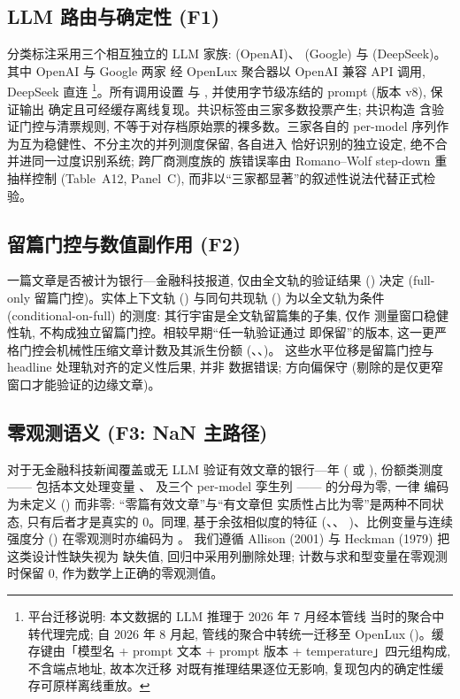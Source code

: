 \subsection{LLM 路由与确定性 (F1)}
分类标注采用三个相互独立的 LLM 家族: 
(OpenAI)、 (Google) 与
 (DeepSeek)。其中 OpenAI 与 Google 两家
经 OpenLux 聚合器以 OpenAI 兼容 API 调用, DeepSeek 直连
\footnote{平台迁移说明: 本文数据的 LLM 推理于 2026 年 7 月经本管线
当时的聚合中转代理完成; 自 2026 年 8 月起, 管线的聚合中转统一迁移至
OpenLux ()。缓存键由「模型名 + prompt
文本 + prompt 版本 + temperature」四元组构成, 不含端点地址, 故本次迁移
对既有推理结果逐位无影响, 复现包内的确定性缓存可原样离线重放。}。所有调用设置  与
, 并使用字节级冻结的 prompt (版本 v8), 保证输出
确定且可经缓存离线复现。共识标签由三家多数投票产生; 共识构造
含验证门控与清票规则, 不等于对存档原始票的裸多数。三家各自的
per-model 序列作为互为稳健性、不分主次的并列测度保留, 各自进入
恰好识别的独立设定, 绝不合并进同一过度识别系统; 跨厂商测度族的
族错误率由 Romano--Wolf step-down 重抽样控制 (Table~A12,
Panel~C), 而非以``三家都显著''的叙述性说法代替正式检验。

\subsection{留篇门控与数值副作用 (F2)}
一篇文章是否被计为银行—金融科技报道, 仅由全文轨的验证结果
() 决定 (full-only 留篇门控)。实体上下文轨
() 与同句共现轨 () 为以全文轨为条件
(conditional-on-full) 的测度: 其行宇宙是全文轨留篇集的子集, 仅作
测量窗口稳健性轨, 不构成独立留篇门控。相较早期``任一轨验证通过
即保留''的版本, 这一更严格门控会机械性压缩文章计数及其派生份额
(、、)。
这些水平位移是留篇门控与 headline 处理轨对齐的定义性后果, 并非
数据错误; 方向偏保守 (剔除的是仅更窄窗口才能验证的边缘文章)。

\subsection{零观测语义 (F3: NaN 主路径)}
对于无金融科技新闻覆盖或无 LLM 验证有效文章的银行—年
( 或 ),
份额类测度 —— 包括本文处理变量 、
 及三个 per-model 孪生列 —— 的分母为零, 一律
编码为未定义 () 而非零: ``零篇有效文章''与``有文章但
实质性占比为零''是两种不同状态, 只有后者才是真实的 $0$。同理,
基于余弦相似度的特征 (、、
)、比例变量与连续强度分
() 在零观测时亦编码为 。
我们遵循 Allison (2001) 与 Heckman (1979) 把这类设计性缺失视为
缺失值, 回归中采用列删除处理; 计数与求和型变量在零观测时保留
$0$, 作为数学上正确的零观测值。

